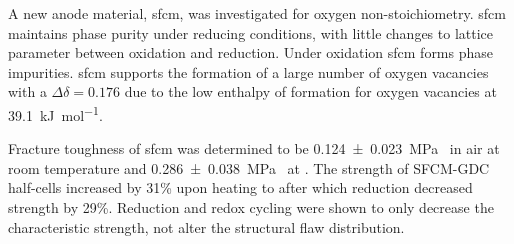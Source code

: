 A new anode material, \gls{sfcm}, was investigated for oxygen non-stoichiometry.
\Gls{sfcm} maintains phase purity under reducing conditions, with little changes to lattice parameter between oxidation and reduction.
Under oxidation \gls{sfcm} forms phase impurities.
\Gls{sfcm} supports the formation of a large number of oxygen vacancies with a $\Delta\delta = 0.176$ due to the low enthalpy of formation for oxygen vacancies at \SI{39.1}{\kilo\joule\per\mol}.

Fracture toughness of \gls{sfcm} was determined to be \SI[separate-uncertainty = true]{0.124 +- 0.023}{\mega\pascal{}} in air at room temperature and \SI[separate-uncertainty = true]{0.286 +- 0.038}{\mega\pascal{}} at .
The strength of SFCM-GDC half-cells increased by 31\% upon heating to  after which reduction decreased strength by 29\%.
Reduction and redox cycling were shown to only decrease the characteristic strength, not alter the structural flaw distribution.

